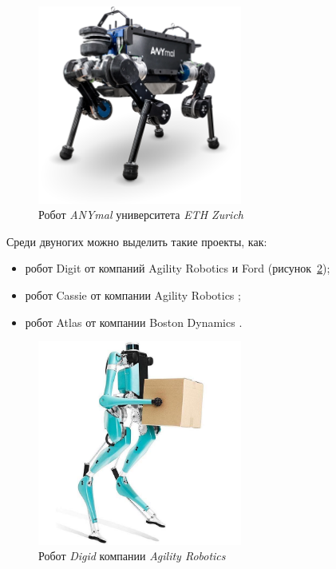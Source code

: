 \begin{figure}[h!]
    \centering
    \includegraphics[width=0.6\textwidth]{chapter_intro/figure2.png}
    \caption{Робот \textit{ANYmal} университета \textit{ ETH Zurich}}
    \label{fig:intro2}
\end{figure}

Среди двуногих можно выделить такие проекты, как:

\begin{itemize}
    \item робот Digit от компаний Agility Robotics и Ford \cite{Agility2020_2} (рисунок~\ref{fig:intro3});
    \item робот Cassie от компании Agility Robotics \cite{Agility2020_2};
    \item робот Atlas от компании Boston Dynamics \cite{BostonDynamics2020}.
\end{itemize}

\begin{figure}[h]
    \centering
    \includegraphics[width=0.6\textwidth]{chapter_intro/figure3.jpg}
    \caption{Робот \textit{Digid} компании \textit{ Agility Robotics}}
    \label{fig:intro3}
\end{figure}

